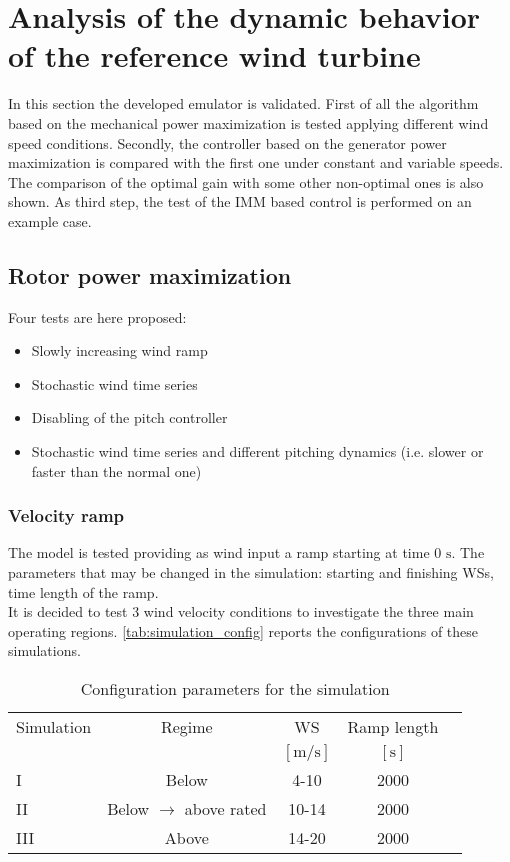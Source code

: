 \newpage
\section{Analysis of the dynamic behavior of the reference wind turbine}\label{sec:c_basic_model_simulation}
In this section the developed emulator is validated. First of all the algorithm based on the mechanical power maximization is tested applying different wind speed conditions. Secondly, the controller based on the generator power maximization is compared with the first one under constant and variable speeds. The comparison of the optimal gain with some other non-optimal ones is also shown. As third step, the test of the IMM based control is performed on an example case. 
                                                  
\subsection{Rotor power maximization}
Four tests are here proposed:
\begin{itemize}
  \item Slowly increasing wind ramp
  \item Stochastic wind time series
  \item Disabling of the pitch controller
  \item Stochastic wind time series and different pitching dynamics (i.e. slower or faster than the normal one)
\end{itemize}

\subsubsection{Velocity ramp}
The model is tested providing as wind input a ramp starting at time 0 $\si{\second}$. The parameters that may be changed in the simulation: starting and finishing WSs, time length of the ramp.\\
It is decided to test 3 wind velocity conditions to investigate the three main operating regions. \autoref{tab:simulation_config} reports the configurations of these simulations. 
\begin{table}[!htbp]
    \caption{Configuration parameters for the simulation}
    \centering
    \begin{tabular}{lcccc}
    \toprule
      Simulation & Regime  & WS & Ramp length \\ 
       & & $\left[\si{\meter\per\second}\right]$ & $\left[\si{\second}\right]$ \\ \midrule       
       I & Below & 4-10 & 2000  \\
       II & Below $\rightarrow$ above rated & 10-14 & 2000 \\
       III & Above & 14-20 & 2000  \\
       \bottomrule
    \end{tabular}
    \label{tab:simulation_config}
\end{table}

